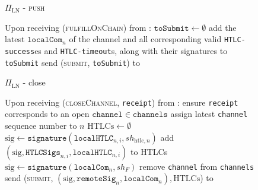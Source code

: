 \begin{figure}[H]
\begin{protocolbox}{$\Pi_{\mathrm{LN}}$ - \textsc{push}}
\begin{algorithmic}[1]
        \State Upon receiving (\textsc{fulfillOnChain}) from \environment:
        \Indent
          \State $\mathtt{toSubmit} \gets \emptyset$
              \State add the latest $\mathtt{localCom}_n$ of the channel and all
              corresponding valid \texttt{HTLC-success}es and
              \texttt{HTLC-timeout}s, along with their signatures to
              \texttt{toSubmit}
            \EndIf
          \EndFor
          \State send (\textsc{submit}, \texttt{toSubmit}) to \ledger
        \EndIndent
      \end{algorithmic}
    \end{protocolbox}
    \caption{}
    \label{alg:protocol:pay:push}
  \end{figure}

  \begin{figure}[H]
    \begin{protocolbox}{$\Pi_{\mathrm{LN}}$ - close}
      \begin{algorithmic}[1]
        \State Upon receiving (\textsc{closeChannel}, \texttt{receipt}) from
        \environment:
        \Indent
          \State ensure \texttt{receipt} corresponds to an open
          $\mathtt{channel} \in \mathtt{channels}$
          \State assign latest \texttt{channel} sequence number to $n$
          \State $\mathrm{HTLCs} \gets \emptyset$
            \State $\mathrm{sig} \gets
            \mathtt{signature}\left(\mathtt{localHTLC}_{n, i},
            sh_{\mathrm{htlc}, n}\right)$
            \State add $\left(\mathrm{sig}, \mathtt{HTLCSigs}_{n, i},
            \mathtt{localHTLC}_{n, i}\right)$ to HTLCs
          \EndFor
          \State $\mathrm{sig} \gets
          \mathtt{signature}\left(\mathtt{localCom}_n, sh_F\right)$
          \State remove \texttt{channel} from \texttt{channels}
          \State send (\textsc{submit}, $\left(\mathrm{sig},
          \mathtt{remoteSig}_n, \mathtt{localCom}_n\right), \mathrm{HTLCs}$) to
          \ledger
        \EndIndent
      \end{algorithmic}
    \end{protocolbox}
    \caption{}
    \label{alg:protocol:close}
  \end{figure}
